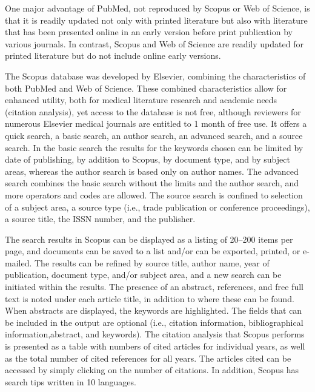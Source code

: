 \begin{enumerate}
	One major advantage of PubMed, not reproduced by Scopus or Web of Science, is that it is readily updated 	not only with printed literature but also with literature 	that has been presented online in an early version before print publication by various journals. In contrast, Scopus and Web of Science are readily updated for printed literature but do not include online early
	versions.
	
	The Scopus database was developed by Elsevier, combining the characteristics of both PubMed and Web of Science. These combined characteristics allow
	for enhanced utility, both for medical literature research and academic needs (citation analysis), yet access to the database is not free, although reviewers for numerous Elsevier medical journals are entitled to 1 month of free use. It offers a quick search, a basic search, an author search, an advanced search, and a source search. In the basic search the results for the keywords chosen can be limited by date of publishing, by addition to Scopus, by document type, and by subject areas, whereas the author search is based only on author names. The advanced search combines the basic search without the limits and the author search, and more operators and codes are allowed. The source search is confined to selection of a subject area, a source type (i.e., trade publication or conference proceedings), a source title, the ISSN number, and the publisher.
	
	The search results in Scopus can be displayed as a listing of 20–200 items per page, and documents can be saved to a list and/or can be exported, printed, or
	e-mailed. The results can be refined by source title, author name, year of publication, document type, and/or subject area, and a new search can be initiated within the results. The presence of an abstract, references, and free full text is noted under each article title, in addition to where these can be found. When abstracts are displayed, the keywords are highlighted. The fields that can be included in the output are optional (i.e., citation information, bibliographical information,abstract, and keywords). The citation analysis that Scopus performs is presented as a table with numbers of cited articles for individual years, as well as the total number of cited references for all years. The articles cited can be accessed by simply clicking on the number of citations. In addition, Scopus has search tips written in 10 languages. 
	

\end{enumerate}
